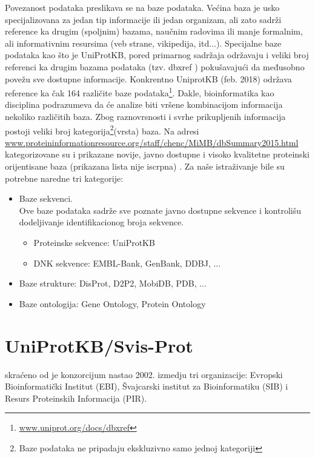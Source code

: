 Povezanost podataka preslikava se na baze podataka. Većina baza je usko specijalizovana
za jedan tip informacije ili jedan organizam, ali zato sadrži reference ka
drugim (spoljnim) bazama, naučnim radovima ili  manje formalnim, ali
informativnim resursima (veb strane, vikipedija, itd...). Specijalne baze podataka kao
što je UniProtKB, pored primarnog sadržaja održavaju i veliki broj referenci ka
drugim bazama podataka (tzv. dbxref ) pokušavajući
da međusobno povežu sve dostupne informacije. Konkrentno UniprotKB (feb. 2018)
održava reference ka čak 164 različite baze
podataka\footnote{\url{www.uniprot.org/docs/dbxref}}.  Dakle, bioinformatika
kao disciplina podrazumeva da će analize biti vršene kombinacijom informacija
nekoliko različitih baza.  Zbog raznovrsnosti i svrhe prikupljenih informacija
postoji veliki broj kategorija\footnote{Baze podataka ne pripadaju ekskluzivno
samo jednoj kategoriji}(vrsta) baza.  Na adresi
\url{www.proteininformationresource.org/staff/chenc/MiMB/dbSummary2015.html}
kategorizovane su i prikazane novije, javno dostupne i visoko kvalitetne
proteinski orijentisane baza (prikazana lista nije iscrpna)
\parencite{Chen2017}. Za naše istraživanje bile su potrebne naredne tri
kategorije:

\begin{itemize}
  \item Baze sekvenci.\\ 
        Ove baze podataka sadrže sve poznate javno dostupne sekvence i kontrolišu dodeljivanje 
        identifikacionog broja sekvence.
    \begin{itemize}
      \item Proteinske sekvence: UniProtKB
      \item DNK sekvence: EMBL-Bank, GenBank, DDBJ, ...
    \end{itemize}
  \item Baze strukture: DisProt, D2P2, MobiDB, PDB, ...
  \item Baze ontologija: Gene Ontology, Protein Ontology
\end{itemize}


\section{UniProtKB/Svis-Prot}
\label{svis-prot}

 skraćeno od  je konzorcijum
nastao 2002. izmedju tri organizacije: Evropski Bioinformatički
Institut (EBI), Švajcarski institut za Bioinformatiku (SIB) i Resurs
Proteinskih Informacija (PIR).  


